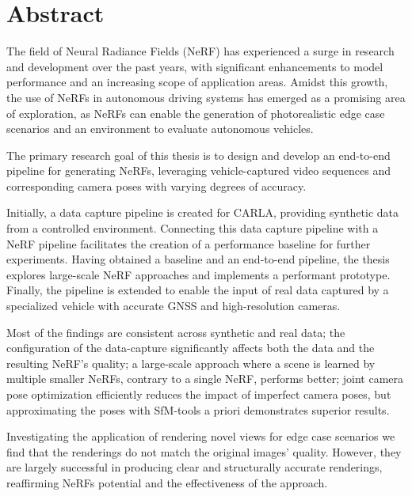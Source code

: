 \chapter*{Abstract}

The field of Neural Radiance Fields (NeRF) has experienced a surge in research and development over the past years, with significant enhancements to model performance and an increasing scope of application areas. Amidst this growth, the use of NeRFs in autonomous driving systems has emerged as a promising area of exploration, as NeRFs can enable the generation of photorealistic edge case scenarios and an environment to evaluate autonomous vehicles.

The primary research goal of this thesis is to design and develop an end-to-end pipeline for generating NeRFs, leveraging vehicle-captured video sequences and corresponding camera poses with varying degrees of accuracy.

Initially, a data capture pipeline is created for CARLA, providing synthetic data from a controlled environment. Connecting this data capture pipeline with a NeRF pipeline facilitates the creation of a performance baseline for further experiments. Having obtained a baseline and an end-to-end pipeline, the thesis explores large-scale NeRF approaches and implements a performant prototype. Finally, the pipeline is extended to enable the input of real data captured by a specialized vehicle with accurate GNSS and high-resolution cameras.

Most of the findings are consistent across synthetic and real data; the configuration of the data-capture significantly affects both the data and the resulting NeRF's quality; a large-scale approach where a scene is learned by multiple smaller NeRFs, contrary to a single NeRF, performs better; joint camera pose optimization efficiently reduces the impact of imperfect camera poses, but approximating the poses with SfM-tools a priori demonstrates superior results.

Investigating the application of rendering novel views for edge case scenarios we find that the renderings do not match the original images' quality. However, they are largely successful in producing clear and structurally accurate renderings, reaffirming NeRFs potential and the effectiveness of the approach.